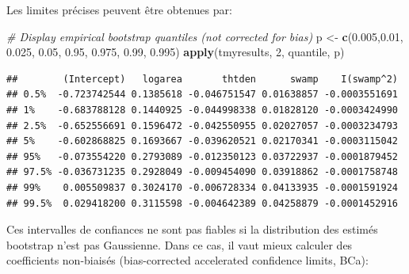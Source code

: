 \documentclass[12pt,]{book}
\newenvironment{Shaded}{\begin{snugshade}}{\end{snugshade}}
\newcommand{\CommentTok}[1]{\textcolor[rgb]{0.56,0.35,0.01}{\textit{#1}}}
\newcommand{\DecValTok}[1]{\textcolor[rgb]{0.00,0.00,0.81}{#1}}
\newcommand{\FloatTok}[1]{\textcolor[rgb]{0.00,0.00,0.81}{#1}}
\newcommand{\KeywordTok}[1]{\textcolor[rgb]{0.13,0.29,0.53}{\textbf{#1}}}
\newcommand{\NormalTok}[1]{#1}
\newcommand{\StringTok}[1]{\textcolor[rgb]{0.31,0.60,0.02}{#1}}
\begin{document}
Les limites précises peuvent être obtenues par:

\begin{Shaded}
\begin{Highlighting}[]
\CommentTok{# Display empirical bootstrap quantiles (not corrected for bias)}
\NormalTok{p <-}\StringTok{ }\KeywordTok{c}\NormalTok{(}\FloatTok{0.005}\NormalTok{,}\FloatTok{0.01}\NormalTok{, }\FloatTok{0.025}\NormalTok{, }\FloatTok{0.05}\NormalTok{, }\FloatTok{0.95}\NormalTok{, }\FloatTok{0.975}\NormalTok{, }\FloatTok{0.99}\NormalTok{, }\FloatTok{0.995}\NormalTok{)}
\KeywordTok{apply}\NormalTok{(tmyresults, }\DecValTok{2}\NormalTok{, quantile, p)}
\end{Highlighting}
\end{Shaded}

\begin{verbatim}
##        (Intercept)   logarea       thtden      swamp    I(swamp^2)
## 0.5%  -0.723742544 0.1385618 -0.046751547 0.01638857 -0.0003551691
## 1%    -0.683788128 0.1440925 -0.044998338 0.01828120 -0.0003424990
## 2.5%  -0.652556691 0.1596472 -0.042550955 0.02027057 -0.0003234793
## 5%    -0.602868825 0.1693667 -0.039620521 0.02170341 -0.0003115042
## 95%   -0.073554220 0.2793089 -0.012350123 0.03722937 -0.0001879452
## 97.5% -0.036731235 0.2928049 -0.009454090 0.03918862 -0.0001758748
## 99%    0.005509837 0.3024170 -0.006728334 0.04133935 -0.0001591924
## 99.5%  0.029418200 0.3115598 -0.004642389 0.04258879 -0.0001452916
\end{verbatim}

Ces intervalles de confiances ne sont pas fiables si la distribution des estimés bootstrap n'est pas Gaussienne. Dans ce cas, il vaut mieux calculer des coefficients non-biaisés (bias-corrected accelerated confidence limits, BCa):
\end{document}
